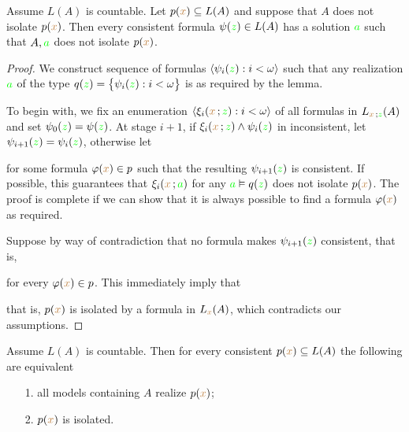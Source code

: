 \documentclass[creche.tex]{subfiles}
\begin{document}
\begin{lemma}\label{lem_kuratowskiUlam}
Assume $L(A)$ is countable. Let $p({\color{brown} x})\subseteq L(A)$ and suppose that $A$ does not isolate $p({\color{brown} x})$. Then every consistent formula $\psi({\color{green} z})\in L(A)$ has a solution ${\color{green} a}$ such that $A,{\color{green} a}$ does not isolate $p({\color{brown} x})$.
\end{lemma}
\begin{proof}
We construct sequence of formulas $\langle\psi_i({\color{green} z}):i<\omega\rangle$ such that any realization ${\color{green} a}$ of the type  $q({\color{green} z})=\big\{\psi_i({\color{green} z}):i<\omega\big\}$ is as required by the lemma.

To begin with, we fix an enumeration $\langle\xi_i({\color{brown} x}\,;{\color{green} z}):i<\omega\rangle$ of all formulas in $L_{{\color{brown} x}\,;{\color{green} z}}(A)$ and set $\psi_0({\color{green} z})= \psi({\color{green} z})$. At stage $i+1$, if $\xi_i({\color{brown} x}\,;{\color{green} z})\wedge\psi_i({\color{green} z})$ in inconsistent, let $\psi_{i+1}({\color{green} z})=\psi_i({\color{green} z})$, otherwise let

 
for some formula $\varphi({\color{brown} x})\in p$ such that the resulting $\psi_{i+1}({\color{green} z})$ is consistent. If possible, this guarantees that $\xi_i({\color{brown} x}\,;{\color{green} a})$ for any ${\color{green} a}\vDash q({\color{green} z})$ does not isolate $p({\color{brown} x})$. The proof is complete if we can show that it is always possible to find a formula $\varphi({\color{brown} x})$ as required. 

Suppose by way of contradiction that no formula makes $\psi_{i+1}({\color{green} z})$ consistent, that is, 


for every $\varphi({\color{brown} x})\in p$. This immediately imply that 



that is, $p({\color{brown} x})$ is isolated by a formula in $L_{{\color{brown} x}}(A)$, which contradicts our assumptions.
\end{proof}

\begin{theorem} Assume $L(A)$ is countable. Then for every consistent $p({\color{brown} x})\subseteq L(A)$ the following are equivalent
\begin{itemize}   
\item[1.] all models containing $A$ realize $p({\color{brown} x})$;
\item[2.] $p({\color{brown} x})$ is isolated.
\end{itemize}
\end{theorem}
\end{document}
